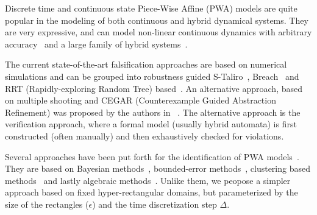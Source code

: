 Discrete time and continuous state Piece-Wise Affine (PWA) models are
quite popular in the modeling of both continuous and hybrid dynamical
systems. They are very expressive, and can model non-linear continuous
dynamics with arbitrary accuracy~\cite{wen2008basis} and a large
family of hybrid systems~\cite{heemels2001equivalence}.

 The current
state-of-the-art falsification approaches are based on numerical
simulations and can be grouped into robustness guided
S-Taliro~\cite{annpureddy2011s}, Breach~\cite{donze2010breach} and RRT
(Rapidly-exploring Random Tree)
based~\cite{nahhal_test_2007,Dang09,dreossi2015efficient}.  An
alternative approach, based on multiple shooting and CEGAR
(Counterexample Guided Abstraction Refinement) was proposed by the
authors in ~\cite{zutshi2014multiple}.  The alternative approach is
the verification approach, where a formal model (usually hybrid
automata) is first constructed (often manually) and then exhaustively
checked for violations.

 Several approaches have been put
forth for the identification of PWA models~\cite{paoletti2007identification}.
They are based on Bayesian methods~\cite{juloski2005bayesian}, bounded-error
methods~\cite{bemporad2003greedy,bemporad2005bounded,roll2004identification},
clustering based methods~\cite{ferrari2003clustering} and lastly algebraic
methods~\cite{vidal2003algebraic}. Unlike them, we peopose a simpler
approach based on fixed hyper-rectangular domains, but parameterized
by the size of the rectangles ($\epsilon$) and the time discretization
step $\Delta$.



